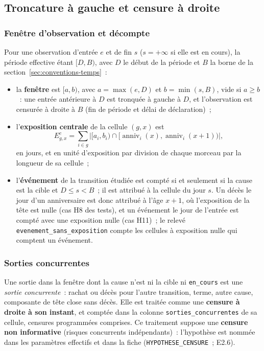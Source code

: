 \documentclass[a4paper,11pt]{article}
\newcommand{\code}[1]{\texttt{\small #1}}
\begin{document}
\subsection{Troncature à gauche et censure à droite}
\label{sec:troncature-censure}

\subsubsection*{Fenêtre d'observation et décompte}

Pour une observation d'entrée $e$ et de fin $s$ ($s = +\infty$ si elle est en
cours), la période effective étant $[D, B)$, avec $D$ le début de la période
et $B$ la borne de la section~\ref{sec:conventions-temps}~:

\begin{itemize}[leftmargin=*, itemsep=2pt]
  \item la \textbf{fenêtre} est $[a, b)$, avec $a = \max(e, D)$ et
    $b = \min(s, B)$, vide si $a \ge b$~: une entrée antérieure à $D$ est
    tronquée à gauche à $D$, et l'observation est censurée à droite à $B$
    (fin de période et délai de déclaration)~;
  \item l'\textbf{exposition centrale} de la cellule $(g, x)$ est
    \[
      E^{c}_{g,x} = \sum_{i \in g} \bigl|[a_i, b_i) \cap
      [\operatorname{anniv}_i(x), \operatorname{anniv}_i(x+1))\bigr|,
    \]
    en jours, et en unité d'exposition par division de chaque morceau par la
    longueur de sa cellule~;
  \item l'\textbf{événement} de la transition étudiée est compté si et
    seulement si la cause est la cible et $D \le s < B$~; il est attribué à
    la cellule du jour $s$. Un décès le jour d'un anniversaire est donc
    attribué à l'âge $x+1$, où l'exposition de la tête est nulle (cas H8 des
    tests), et un événement le jour de l'entrée est compté avec une exposition
    nulle (cas H11)~; le relevé \code{evenement\_sans\_exposition} compte les
    cellules à exposition nulle qui comptent un événement.
\end{itemize}

\subsubsection*{Sorties concurrentes}

Une sortie dans la fenêtre dont la cause n'est ni la cible ni \code{en\_cours}
est une \emph{sortie concurrente}~: rachat ou décès pour l'autre transition,
terme, autre cause, composante de tête close sans décès. Elle est traitée
comme une \textbf{censure à droite à son instant}, et comptée dans la colonne
\code{sorties\_concurrentes} de sa cellule, censures programmées comprises.
Ce traitement suppose une \textbf{censure non informative} (risques
concurrents indépendants)~: l'hypothèse est nommée dans les paramètres
effectifs et dans la fiche (\code{HYPOTHESE\_CENSURE}~; E2.6).
\end{document}
